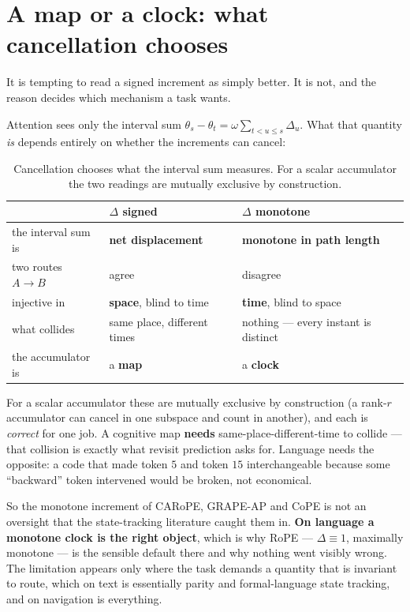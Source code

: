 \documentclass[11pt]{article}
\begin{document}
\section{A map or a clock: what cancellation chooses}
\label{sec:clockmap}

It is tempting to read a signed increment as simply better. It is not, and the
reason decides which mechanism a task wants.

Attention sees only the interval sum
$\theta_s - \theta_t = \omega\sum_{t<u\le s}\Delta_u$. What that quantity
\emph{is} depends entirely on whether the increments can cancel:

\begin{table}[htbp]\centering\small
\caption{Cancellation chooses what the interval sum measures. For a scalar accumulator the two readings are mutually exclusive by construction.}
\label{tab:clockmap}
\begin{tabular}{@{}p{3.0cm}p{5.3cm}p{5.6cm}@{}}
\toprule
 & $\Delta$ signed & $\Delta$ monotone \\
\midrule
the interval sum is & \textbf{net displacement} & \textbf{monotone in path length} \\[2pt]
two routes $A\!\to\!B$ & agree & disagree \\[2pt]
injective in & \textbf{space}, blind to time & \textbf{time}, blind to space \\[2pt]
what collides & same place, different times & nothing --- every instant is distinct \\[2pt]
the accumulator is & a \textbf{map} & a \textbf{clock} \\
\bottomrule
\end{tabular}
\end{table}

\noindent For a scalar accumulator these are mutually exclusive by construction (a
rank-$r$ accumulator can cancel in one subspace and count in another), and each is
\emph{correct} for one job. A cognitive map \textbf{needs} same-place-different-time to collide ---
that collision is exactly what revisit prediction asks for. Language needs the
opposite: a code that made token $5$ and token $15$ interchangeable because some
``backward'' token intervened would be broken, not economical.

So the monotone increment of CARoPE, GRAPE-AP and CoPE is not an oversight that the
state-tracking literature caught them in. \textbf{On language a monotone clock is the
right object}, which is why RoPE --- $\Delta\equiv1$, maximally monotone --- is the
sensible default there and why nothing went visibly wrong. The limitation appears
only where the task demands a quantity that is invariant to route, which on text is
essentially parity and formal-language state tracking, and on navigation is
everything.
\end{document}
